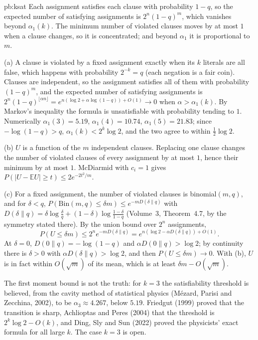 \begin{solution}{pb:ksat}
\idea Each assignment satisfies each clause with probability $1-q$, so the expected number of satisfying assignments is $2^n(1-q)^m$, which vanishes beyond $\alpha_1(k)$. The
minimum number of violated clauses moves by at most $1$ when a clause changes, so it is concentrated; and beyond $\alpha_1$ it is proportional to $m$.

\writeup (a) A clause is violated by a fixed assignment exactly when its $k$ literals are all false, which happens with probability $2^{-k}=q$ (each negation is a fair coin).
Clauses are independent, so the assignment satisfies all of them with probability $(1-q)^m$, and the expected number of satisfying assignments is
$2^n(1-q)^{\lfloor\alpha n\rfloor}=e^{n(\log2+\alpha\log(1-q))+O(1)}\to0$ when $\alpha>\alpha_1(k)$. By Markov's inequality the formula is unsatisfiable with probability tending
to $1$. Numerically $\alpha_1(3)=5.19$, $\alpha_1(4)=10.74$, $\alpha_1(5)=21.83$; since $-\log(1-q)>q$, $\alpha_1(k)<2^k\log2$, and the two agree to within $\frac12\log2$.

(b) $U$ is a function of the $m$ independent clauses. Replacing one clause changes the number of violated clauses of every assignment by at most $1$, hence their minimum by
at most $1$. McDiarmid with $c_i=1$ gives $P(|U-\mathbb EU|\ge t)\le2e^{-2t^2/m}$.

(c) For a fixed assignment, the number of violated clauses is binomial$(m,q)$, and for $\delta<q$, $P(\text{Bin}(m,q)\le\delta m)\le e^{-mD(\delta\|q)}$ with
$D(\delta\|q)=\delta\log\frac\delta q+(1-\delta)\log\frac{1-\delta}{1-q}$ (Volume~3, Theorem~4.7, by the symmetry stated there). By the union bound over $2^n$ assignments,
\[
P(U\le\delta m)\le2^ne^{-mD(\delta\|q)}=e^{n(\log2-\alpha D(\delta\|q))+O(1)}.
\]
At $\delta=0$, $D(0\|q)=-\log(1-q)$ and $\alpha D(0\|q)>\log2$; by continuity there is $\delta>0$ with $\alpha D(\delta\|q)>\log2$, and then $P(U\le\delta m)\to0$. With (b), $U$ is
in fact within $O(\sqrt m)$ of its mean, which is at least $\delta m-O(\sqrt m)$.

\leads The first moment bound is not the truth: for $k=3$ the satisfiability threshold is believed, from the cavity method of statistical physics (M\'ezard, Parisi and Zecchina,
2002), to be $\alpha_3\approx4.267$, below $5.19$. Friedgut (1999) proved that the transition is sharp, Achlioptas and Peres (2004) that the threshold is $2^k\log2-O(k)$, and Ding,
Sly and Sun (2022) proved the physicists' exact formula for all large $k$. The case $k=3$ is open.
\end{solution}

